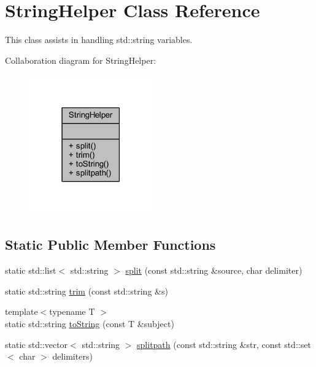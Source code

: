 \hypertarget{class_string_helper}{}\section{String\+Helper Class Reference}
\label{class_string_helper}


This class assists in handling std\+::string variables.  




Collaboration diagram for String\+Helper\+:
\nopagebreak
\begin{figure}[H]
\begin{center}
\leavevmode
\includegraphics[width=150pt]{d4/d58/class_string_helper__coll__graph}
\end{center}
\end{figure}
\subsection*{Static Public Member Functions}
\begin{DoxyCompactItemize}
\item 
static std\+::list$<$ std\+::string $>$ \hyperlink{class_string_helper_a03cb28b0b0ced4aca4ccac59bdd74625}{split} (const std\+::string \&source, char delimiter)
\item 
static std\+::string \hyperlink{class_string_helper_a7861a9bf77dd724b5c046e34fe43eaa4}{trim} (const std\+::string \&s)
\item 
{\footnotesize template$<$typename T $>$ }\\static std\+::string \hyperlink{class_string_helper_a0a203a5eed0ff6d62b0a7530dee06386}{to\+String} (const T \&subject)
\item 
static std\+::vector$<$ std\+::string $>$ \hyperlink{class_string_helper_a783526b9f8fd876bddefd767537f49cf}{splitpath} (const std\+::string \&str, const std\+::set$<$ char $>$ delimiters)
\end{DoxyCompactItemize}


